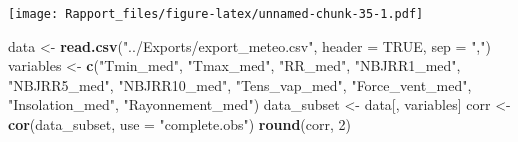 \documentclass[
]{article}
\newenvironment{Shaded}{\begin{snugshade}}{\end{snugshade}}
\newcommand{\AttributeTok}[1]{\textcolor[rgb]{0.13,0.29,0.53}{#1}}
\newcommand{\ConstantTok}[1]{\textcolor[rgb]{0.56,0.35,0.01}{#1}}
\newcommand{\DecValTok}[1]{\textcolor[rgb]{0.00,0.00,0.81}{#1}}
\newcommand{\FunctionTok}[1]{\textcolor[rgb]{0.13,0.29,0.53}{\textbf{#1}}}
\newcommand{\NormalTok}[1]{#1}
\newcommand{\OtherTok}[1]{\textcolor[rgb]{0.56,0.35,0.01}{#1}}
\newcommand{\SpecialCharTok}[1]{\textcolor[rgb]{0.81,0.36,0.00}{\textbf{#1}}}
\newcommand{\StringTok}[1]{\textcolor[rgb]{0.31,0.60,0.02}{#1}}
\begin{document}
\begin{Shaded}
\end{Shaded}

\texttt{[image: Rapport\_files/figure-latex/unnamed-chunk-35-1.pdf]}

\begin{Shaded}
\begin{Highlighting}[]
\NormalTok{ data }\OtherTok{\textless{}{-}} \FunctionTok{read.csv}\NormalTok{(}\StringTok{"../Exports/export\_meteo.csv"}\NormalTok{, }\AttributeTok{header =} \ConstantTok{TRUE}\NormalTok{, }\AttributeTok{sep =} \StringTok{","}\NormalTok{)}
\NormalTok{  variables }\OtherTok{\textless{}{-}} \FunctionTok{c}\NormalTok{(}\StringTok{"Tmin\_med"}\NormalTok{, }\StringTok{"Tmax\_med"}\NormalTok{, }\StringTok{"RR\_med"}\NormalTok{, }\StringTok{"NBJRR1\_med"}\NormalTok{, }\StringTok{"NBJRR5\_med"}\NormalTok{, }
                 \StringTok{"NBJRR10\_med"}\NormalTok{, }\StringTok{"Tens\_vap\_med"}\NormalTok{, }\StringTok{"Force\_vent\_med"}\NormalTok{, }
                 \StringTok{"Insolation\_med"}\NormalTok{, }\StringTok{"Rayonnement\_med"}\NormalTok{)}
\NormalTok{  data\_subset }\OtherTok{\textless{}{-}}\NormalTok{ data[, variables]}
\NormalTok{  corr }\OtherTok{\textless{}{-}} \FunctionTok{cor}\NormalTok{(data\_subset, }\AttributeTok{use =} \StringTok{"complete.obs"}\NormalTok{)}
  \FunctionTok{round}\NormalTok{(corr, }\DecValTok{2}\NormalTok{)}
\end{Highlighting}
\end{Shaded}
\end{document}
